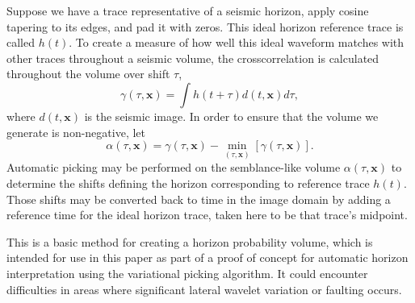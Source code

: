 Suppose we have a trace representative of a seismic horizon, apply cosine tapering to its edges, and pad it  with zeros.  This ideal horizon reference trace is called $h(t)$.  To create a measure of how well this ideal waveform matches with other traces throughout a seismic volume, the crosscorrelation is calculated throughout the volume over shift $\tau$,
\begin{equation}
\label{eq:horiz-xcor}
\gamma(\tau,\mathbf{x}) = \int h(t+\tau)d(t,\mathbf{x}) d\tau,
\end{equation}
where $d(t,\mathbf{x})$ is the seismic image.  In order to ensure that the volume we generate is non-negative, let
\begin{equation}
\label{eq:alpha-horiz}
\alpha(\tau,\mathbf{x}) = \gamma(\tau,\mathbf{x}) - \min_{\left(\tau,\mathbf{x}\right)} \left[ \gamma(\tau,\mathbf{x})\right] .
\end{equation}
Automatic picking may be performed on the semblance-like volume $\alpha(\tau,\mathbf{x})$ to determine the shifts defining the horizon corresponding to reference trace $h(t)$.  Those shifts may be converted back to time in the image domain by adding a reference time for the ideal horizon trace, taken here to be that trace's midpoint.

This is a basic method for creating a horizon probability volume, which is intended for use in this paper as part of a proof of concept for automatic horizon interpretation using the variational picking algorithm.  It could encounter difficulties in areas where significant lateral wavelet variation or faulting occurs.




